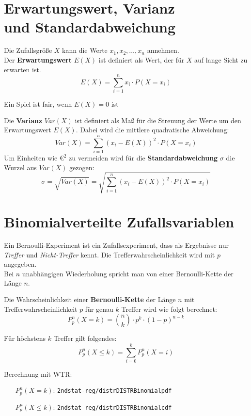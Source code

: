 \documentclass[10pt]{article}
\begin{document}
\section{Erwartungswert, Varianz\\ und Standardabweichung}
\begin{definition}
Die Zufallsgröße $X$ kann die Werte $x_1, x_2, \dots, x_n$ annehmen.\\
Der \textbf{Erwartungswert} $E(X)$ ist definiert als Wert, der für $X$ auf lange Sicht zu erwarten ist.
\[
E(X)=\sum_{i=1}^{n} x_i \cdot P(X = x_i)
\]
\begin{center}
	Ein Spiel ist fair, wenn $E(X)=0$ ist
\end{center}
Die \textbf{Varianz} $Var(X)$ ist definiert als Maß für die Streuung der Werte um den Erwartungswert $E(X)$. Dabei wird die mittlere quadratische Abweichung:
\[
Var(X)=\sum_{i=1}^n(x_i-E(X))^2\cdot P(X=x_i)
\]
Um Einheiten wie $€^2$ zu vermeiden wird für die \textbf{Standardabweichung} $\sigma$ die Wurzel aus $Var(X)$ gezogen:
\[
\sigma=\sqrt{Var(X)}=\sqrt{\sum_{i=1}^n(x_i-E(X))^2\cdot P(X=x_i)}
\]
\end{definition}

\section{Binomialverteilte Zufallsvariablen}
Ein Bernoulli-Experiment ist ein Zufallsexperiment, dass als Ergebnisse nur \textit{Treffer} und \textit{Nicht-Treffer} kennt. Die Trefferwahrscheinlichkeit wird mit $p$ angegeben.\\
Bei $n$ unabhängigen Wiederholung spricht man von einer Bernoulli-Kette der Länge $n$.
\begin{definition}
Die Wahrscheinlichkeit einer \textbf{Bernoulli-Kette} der Länge $n$ mit Trefferwahrscheinlichkeit $p$ für genau $k$ Treffer wird wie folgt berechnet:
\[
P_{p}^{n}(X=k) = \binom{n}{k} \cdot p^k \cdot (1-p)^{n-k}
\]

Für höchstens $k$ Treffer gilt folgendes:
\[
P_{p}^{n}(X\leq k) = \sum_{i=0}^k P_{p}^{n}(X = i)
\]
\end{definition}

\begin{remark}
Berechnung mit WTR:
\begin{itemize}[leftmargin=6em]
	\item[$P_{p}^{n}(X=k)$:] \texttt{2nd\rightarrow stat-reg/distr\rightarrow DISTR\rightarrow Binomialpdf}
	\item[$P_{p}^{n}(X\leq k)$:] \texttt{2nd\rightarrow stat-reg/distr\rightarrow DISTR\rightarrow Binomialcdf}
\end{itemize}
\end{remark}
\end{document}
